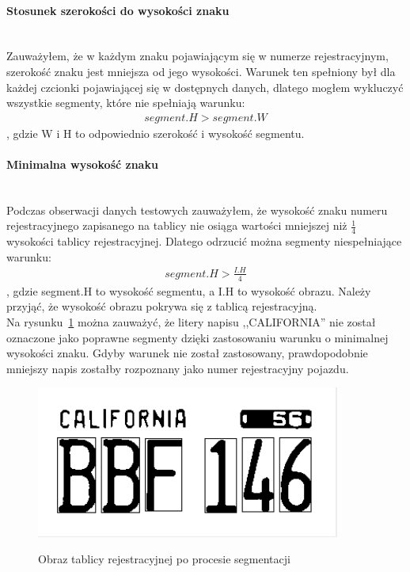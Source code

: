 \paragraph{Stosunek szerokości do wysokości znaku}\mbox{}\\
Zauważyłem, że w każdym znaku pojawiającym się w numerze rejestracyjnym, szerokość znaku jest mniejsza od jego wysokości. Warunek ten spełniony był dla każdej czcionki pojawiającej się w dostępnych danych, dlatego mogłem wykluczyć wszystkie segmenty, które nie spełniają warunku:
\begin{gather*}
  segment.H > segment.W
\end{gather*}, gdzie W i H to odpowiednio szerokość i wysokość segmentu.

\paragraph{Minimalna wysokość znaku}\mbox{}\\
Podczas obserwacji danych testowych zauważyłem, że wysokość znaku numeru rejestracyjnego zapisanego na tablicy nie osiąga wartości mniejszej niż $\frac{1}{4}$ wysokości tablicy rejestracyjnej. Dlatego odrzucić można segmenty niespełniające warunku:
\begin{gather*}
  segment.H > \frac{I.H}{4}
\end{gather*}, gdzie segment.H to wysokość segmentu, a I.H to wysokość obrazu. Należy przyjąć, że wysokość obrazu pokrywa się z tablicą rejestracyjną.\\
Na rysunku~\ref{fig:min_height_condition} można zauważyć, że litery napisu ,,CALIFORNIA'' nie został oznaczone jako poprawne segmenty dzięki zastosowaniu warunku o minimalnej wysokości znaku. Gdyby warunek nie został zastosowany, prawdopodobnie mniejszy napis zostałby rozpoznany jako numer rejestracyjny pojazdu.

\begin{figure}
  \centering
  \includegraphics[width=10cm]{img/min-height-condition-output}
  \label{fig:detect_bg_bad_input}
  \caption{Obraz tablicy rejestracyjnej po procesie segmentacji}
  \label{fig:min_height_condition}
\end{figure}

